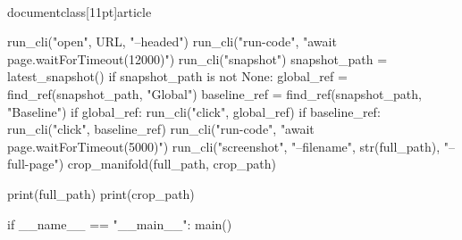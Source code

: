\\documentclass[11pt]{article}
\begin{document}
\begin{CodeBlock}
    run_cli("open", URL, "--headed")
    run_cli("run-code", "await page.waitForTimeout(12000)")
    run_cli("snapshot")
    snapshot_path = latest_snapshot()
    if snapshot_path is not None:
        global_ref = find_ref(snapshot_path, "Global")
        baseline_ref = find_ref(snapshot_path, "Baseline")
        if global_ref:
            run_cli("click", global_ref)
        if baseline_ref:
            run_cli("click", baseline_ref)
        run_cli("run-code", "await page.waitForTimeout(5000)")
    run_cli("screenshot", "--filename", str(full_path), "--full-page")
    crop_manifold(full_path, crop_path)

    print(full_path)
    print(crop_path)


if __name__ == "__main__":
    main()

\end{CodeBlock}
\end{document}
